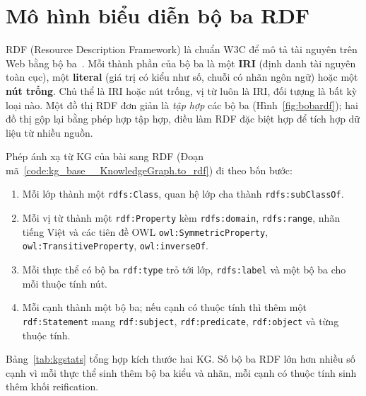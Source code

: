 
\section{Mô hình biểu diễn bộ ba RDF}
RDF (Resource Description Framework) là chuẩn W3C để mô tả tài nguyên trên Web bằng bộ
ba~\cite{w3c2014rdf}. Mỗi thành phần của bộ ba là một \textbf{IRI} (định danh tài nguyên toàn cục), một
\textbf{literal} (giá trị có kiểu như số, chuỗi có nhãn ngôn ngữ) hoặc một \textbf{nút trống}. Chủ thể là IRI hoặc
nút trống, vị từ luôn là IRI, đối tượng là bất kỳ loại nào. Một đồ thị RDF đơn giản là \emph{tập hợp} các bộ ba
(Hình~\ref{fig:bobardf}); hai đồ thị gộp lại bằng phép hợp tập hợp, điều làm RDF đặc biệt hợp để tích hợp dữ liệu
từ nhiều nguồn.


Phép ánh xạ từ KG của bài sang RDF (Đoạn mã~\ref{code:kg_base__KnowledgeGraph.to_rdf}) đi theo bốn bước:

\begin{enumerate}
  \item Mỗi lớp thành một \texttt{rdfs:Class}, quan hệ lớp cha thành \texttt{rdfs:subClassOf}.
  \item Mỗi vị từ thành một \texttt{rdf:Property} kèm \texttt{rdfs:domain}, \texttt{rdfs:range}, nhãn tiếng Việt và
        các tiên đề OWL \texttt{owl:SymmetricProperty}, \texttt{owl:TransitiveProperty}, \texttt{owl:inverseOf}.
  \item Mỗi thực thể có bộ ba \texttt{rdf:type} trỏ tới lớp, \texttt{rdfs:label} và một bộ ba cho mỗi thuộc tính nút.
  \item Mỗi cạnh thành một bộ ba; nếu cạnh có thuộc tính thì thêm một \texttt{rdf:Statement} mang
        \texttt{rdf:subject}, \texttt{rdf:predicate}, \texttt{rdf:object} và từng thuộc tính.
\end{enumerate}


Bảng~\ref{tab:kgstats} tổng hợp kích thước hai KG. Số bộ ba RDF lớn hơn nhiều số cạnh vì mỗi thực thể sinh thêm
bộ ba kiểu và nhãn, mỗi cạnh có thuộc tính sinh thêm khối reification.

